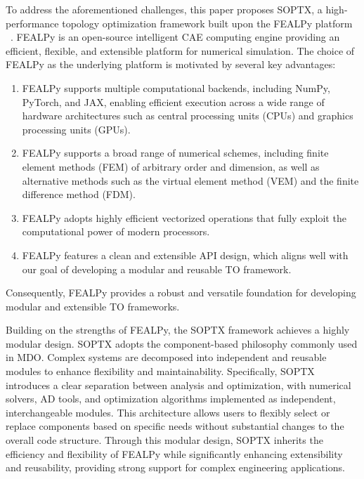 \documentclass[mathpazo]{cicp}
\begin{document}
To address the aforementioned challenges, this paper proposes SOPTX, a high-performance topology optimization framework built upon the FEALPy platform ~\cite{fealpy}. FEALPy is an open-source intelligent CAE computing engine providing an efficient, flexible, and extensible platform for numerical simulation. The choice of FEALPy as the underlying platform is motivated by several key advantages:
\begin{enumerate}
	\item FEALPy supports multiple computational backends, including NumPy, PyTorch, and JAX, enabling efficient execution across a wide range of hardware architectures such as central processing units (CPUs) and graphics processing units (GPUs).
	\item FEALPy supports a broad range of numerical schemes, including finite element methods (FEM) of arbitrary order and dimension, as well as alternative methods such as the virtual element method (VEM) and the finite difference method (FDM).
	\item FEALPy adopts highly efficient vectorized operations that fully exploit the computational power of modern processors.
	\item FEALPy features a clean and extensible API design, which aligns well with our goal of developing a modular and reusable TO framework.
\end{enumerate}
Consequently, FEALPy provides a robust and versatile foundation for developing modular and extensible TO frameworks.

Building on the strengths of FEALPy, the SOPTX framework achieves a highly modular design. SOPTX adopts the component-based philosophy commonly used in MDO. Complex systems are decomposed into independent and reusable modules to enhance flexibility and maintainability. Specifically, SOPTX introduces a clear separation between analysis and optimization, with numerical solvers, AD tools, and optimization algorithms implemented as independent, interchangeable modules. This architecture allows users to flexibly select or replace components based on specific needs without substantial changes to the overall code structure. Through this modular design, SOPTX inherits the efficiency and flexibility of FEALPy while significantly enhancing extensibility and reusability, providing strong support for complex engineering applications.
\end{document}

